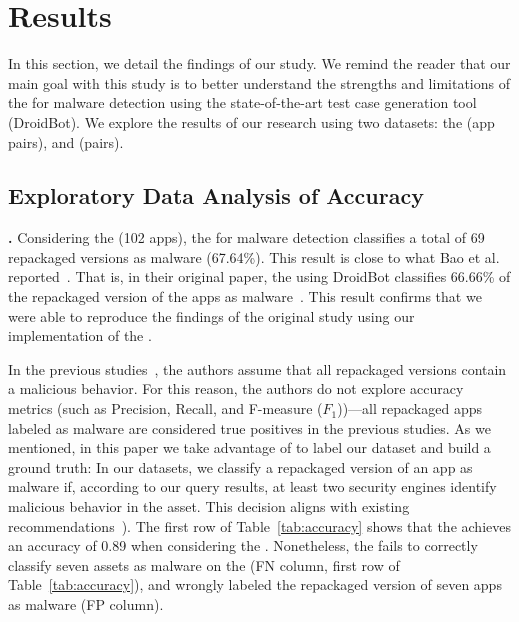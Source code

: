\section{Results}\label{sec:results}


In this section, we detail the findings of our study.  We remind the reader that our main goal with this study is to
better understand the strengths and limitations of the \mas for malware detection using the state-of-the-art
test case generation tool (DroidBot). We explore
the results of our research using two datasets: the \sds (\appsSmall app pairs), and \cds (\apps pairs).


\subsection{Exploratory Data Analysis of Accuracy}\label{sec:accuracy}


{\bf \sds.} Considering the \sds (102 apps), the \mas for malware detection 
classifies a total of 69 repackaged versions as malware (67.64\%).
This result is close to what Bao et al. reported~\cite{DBLP:conf/wcre/BaoLL18}.
That is, in their original paper,  the \mas using DroidBot classifies 66.66\% of the
repackaged version of the apps as malware~\cite{DBLP:conf/wcre/BaoLL18}.
This result confirms that we were able to reproduce the findings of the original study using our
implementation of the \mas. 


In the previous studies~\cite{DBLP:conf/wcre/BaoLL18,DBLP:journals/jss/CostaMMSSBNR22},
the authors assume that all repackaged versions contain a
malicious behavior. For this reason, the authors do not
explore accuracy metrics (such as Precision, Recall, and
F-measure ($F_1$))---all repackaged apps labeled as
malware are considered true positives in the previous studies.
As we mentioned, in this paper we take advantage
of \vt to label our dataset and build a ground truth:
In our datasets, we classify a repackaged version of an app as malware if, according to our \vt
query results, at least two security engines identify malicious behavior in the asset.
This decision aligns with existing recommendations~\cite{vt-label,DBLP:journals/ese/KhanmohammadiEH19}).
The first row of Table~\ref{tab:accuracy} shows that the \mas achieves an accuracy of 0.89 when
considering the \sds. Nonetheless, the \mas fails
to correctly classify seven assets as malware on the \sds (FN column, first row of Table~\ref{tab:accuracy}),
and wrongly labeled the repackaged version of seven apps as malware (FP column).


